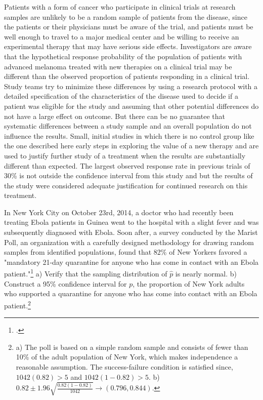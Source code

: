Patients with a form of cancer who participate in clinical trials at research samples are unlikely to be a random sample of patients from the disease, since the patients or their physicians must be aware of the trial, and patients must be well enough to travel to a major medical center and be willing to receive an experimental therapy that may have serious side effects.  Investigators are aware that the hypothetical response probability of the population of patients with advanced melanoma treated with new therapies on a clinical trial may be different than the observed proportion of patients responding in a clinical trial.  Study teams try to minimize these differences by using a research protocol with a detailed specification of the characteristics of the disease used to decide if a patient was eligible for the study and assuming that other potential differences do not have a large effect on outcome.  But there can be no guarantee that systematic differences between a study sample and an overall population do not influence the results.  Small, initial studies in which there is no control group like the one described here early steps in exploring the value of a new therapy and are used to justify further study of a treatment when the results are substantially different than expected.  The largest observed response rate in previous trials of 30\% is not outside the confidence interval from this study and but the results of the study were considered adequate justification for continued research on this treatment.


\begin{exercise}
In New York City on October 23rd, 2014, a doctor who had recently been treating Ebola patients in Guinea went to the hospital with a slight fever and was subsequently diagnosed with Ebola. Soon after, a survey conducted by the Marist Poll, an organization with a carefully designed methodology for drawing random samples from identified populations, found that 82\% of New Yorkers favored a "mandatory 21-day quarantine for anyone who has come in contact with an Ebola patient."\footnote{.} a) Verify that the sampling distribution of $\hat{p}$ is nearly normal. b) Construct a 95\% confidence interval for $p$, the proportion of New York adults who supported a quarantine for anyone who has come into contact with an Ebola patient.\footnote{a) The poll is based on a simple random sample and consists of fewer than 10\% of the adult population of New York, which makes independence a reasonable assumption. The success-failure condition is satisfied since, $1042(0.82) > 5$ and $1042(1-0.82) > 5$. b) $0.82 \pm 1.96\sqrt{\frac{0.82(1-0.82)}{1042}} \rightarrow (0.796, 0.844)$. }
\end{exercise}


